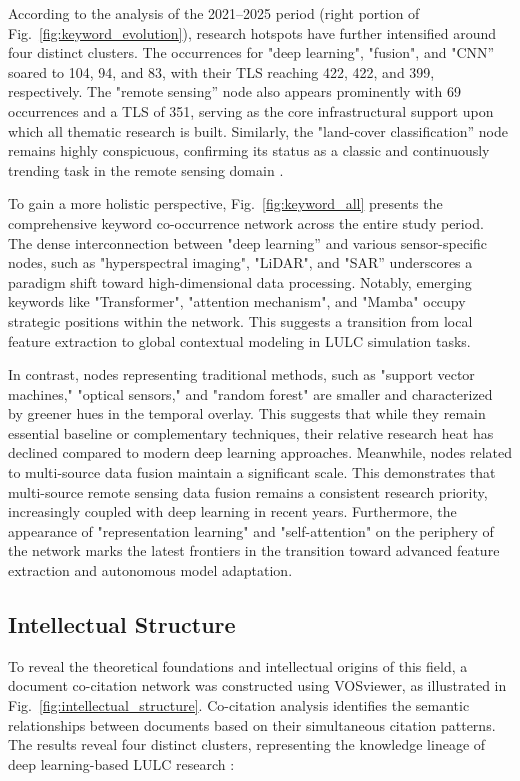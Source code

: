 \documentclass[]{interact}
\theoremstyle{plain}%
\theoremstyle{definition}
\theoremstyle{remark}
\begin{document}
According to the analysis of the 2021--2025 period (right portion of Fig.~\ref{fig:keyword_evolution}), research hotspots have further intensified around four distinct clusters. The occurrences for "deep learning", "fusion", and "CNN” soared to 104, 94, and 83, with their TLS reaching 422, 422, and 399, respectively. The "remote sensing” node also appears prominently with 69 occurrences and a TLS of 351, serving as the core infrastructural support upon which all thematic research is built. Similarly, the "land-cover classification” node remains highly conspicuous, confirming its status as a classic and continuously trending task in the remote sensing domain \citep{cao2020urban}.

To gain a more holistic perspective, Fig.~\ref{fig:keyword_all} presents the comprehensive keyword co-occurrence network across the entire study period. The dense interconnection between "deep learning” and various sensor-specific nodes, such as "hyperspectral imaging", "LiDAR", and "SAR” underscores a paradigm shift toward high-dimensional data processing. Notably, emerging keywords like "Transformer", "attention mechanism", and "Mamba" occupy strategic positions within the network. This suggests a transition from local feature extraction to global contextual modeling in LULC simulation tasks.

In contrast, nodes representing traditional methods, such as "support vector machines," "optical sensors," and "random forest" \citep{belgiu2016random} are smaller and characterized by greener hues in the temporal overlay. This suggests that while they remain essential baseline or complementary techniques, their relative research heat has declined compared to modern deep learning approaches. Meanwhile, nodes related to multi-source data fusion maintain a significant scale. This demonstrates that multi-source remote sensing data fusion remains a consistent research priority, increasingly coupled with deep learning in recent years. Furthermore, the appearance of "representation learning" and "self-attention" on the periphery of the network marks the latest frontiers in the transition toward advanced feature extraction and autonomous model adaptation.

\subsection{Intellectual Structure}
To reveal the theoretical foundations and intellectual origins of this field, a document co-citation network was constructed using VOSviewer, as illustrated in Fig.~\ref{fig:intellectual_structure}. Co-citation analysis identifies the semantic relationships between documents based on their simultaneous citation patterns. The results reveal four distinct clusters, representing the knowledge lineage of deep learning-based LULC research \citep{19}:
\end{document}
